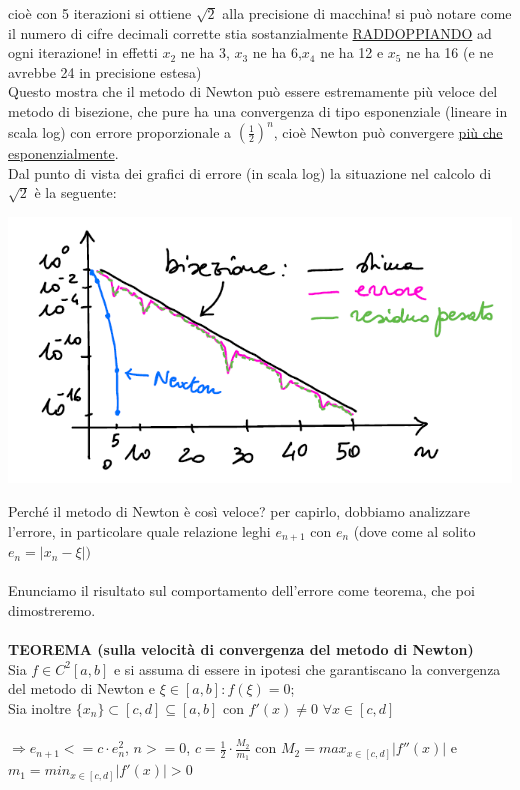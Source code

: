 \documentclass[12pt]{article}
\begin{document}
cioè con 5 iterazioni si ottiene $\sqrt{2}$ alla precisione di macchina! si può notare come il numero di cifre decimali corrette stia sostanzialmente \underline{RADDOPPIANDO} ad ogni iterazione! in effetti $x_2$ ne ha 3, $x_3$ ne ha 6,$x_4$ ne ha 12 e $x_5$ ne ha 16 (e ne avrebbe 24 in precisione estesa)\\
Questo mostra che il metodo di Newton può essere estremamente più veloce del metodo di bisezione, che pure ha una convergenza di tipo esponenziale (lineare in scala log) con errore proporzionale a $(\frac{1}{2})^n$, cioè Newton può convergere \underline{più che esponenzialmente}.\\
Dal punto di vista dei grafici di errore (in scala log) la situazione nel calcolo di $\sqrt{2}$ è la seguente:\\
\begin{center}
    \includegraphics[]{pagina25.PNG}
\end{center}
Perché il metodo di Newton è così veloce? per capirlo, dobbiamo analizzare l'errore, in particolare quale relazione leghi $e_{n+1}$ con $e_n$ (dove come al solito $e_n=\left|x_n-\xi \right|)$\\\\
Enunciamo il risultato sul comportamento dell'errore come teorema, che poi dimostreremo.\\\\
\textbf{TEOREMA (sulla velocità di convergenza del metodo di Newton)}\\
Sia $f \in C^2 [a,b]$ e si assuma di essere in ipotesi che garantiscano la convergenza del metodo di Newton e $\xi \in [a,b] : f(\xi) = 0$;\\
Sia inoltre $\{x_n\} \subset [c,d] \subseteq [a,b]$ con $f'(x) \neq 0$ $\forall x\in [c,d]$\\\\
$\Rightarrow e_{n+1} <= c\cdot e_n^2$, $n>=0$, $c = \frac{1}{2} \cdot \frac{M_2}{m_1}$ con $M_2 = max_{x\in[c,d]}|f''(x)|$ e $m_1 = min_{x\in[c,d]}|f'(x)| > 0$\\
\end{document}

